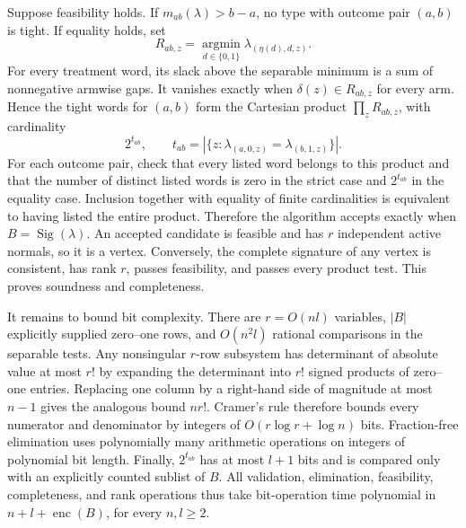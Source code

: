 Suppose feasibility holds. If \(m_{ab}(\lambda)>b-a\), no type with outcome pair \((a,b)\) is tight. If equality holds, set
\[R_{ab,z}=\operatorname*{argmin}_{d\in\{0,1\}}\lambda_{(\eta(d),d,z)}.\]
For every treatment word, its slack above the separable minimum is a sum of nonnegative armwise gaps. It vanishes exactly when \(\delta(z)\in R_{ab,z}\) for every arm. Hence the tight words for \((a,b)\) form the Cartesian product \(\prod_z R_{ab,z}\), with cardinality
\[2^{t_{ab}},\qquad t_{ab}=|\{z:\lambda_{(a,0,z)}=\lambda_{(b,1,z)}\}|.\]
For each outcome pair, check that every listed word belongs to this product and that the number of distinct listed words is zero in the strict case and \(2^{t_{ab}}\) in the equality case. Inclusion together with equality of finite cardinalities is equivalent to having listed the entire product. Therefore the algorithm accepts exactly when \(B=\operatorname{Sig}(\lambda)\). An accepted candidate is feasible and has \(r\) independent active normals, so it is a vertex. Conversely, the complete signature of any vertex is consistent, has rank \(r\), passes feasibility, and passes every product test. This proves soundness and completeness.

It remains to bound bit complexity. There are \(r=O(nl)\) variables, \(|B|\) explicitly supplied zero--one rows, and \(O(n^2l)\) rational comparisons in the separable tests. Any nonsingular \(r\)-row subsystem has determinant of absolute value at most \(r!\) by expanding the determinant into \(r!\) signed products of zero--one entries. Replacing one column by a right-hand side of magnitude at most \(n-1\) gives the analogous bound \(n r!\). Cramer's rule therefore bounds every numerator and denominator by integers of \(O(r\log r+\log n)\) bits. Fraction-free elimination uses polynomially many arithmetic operations on integers of polynomial bit length. Finally, \(2^{t_{ab}}\) has at most \(l+1\) bits and is compared only with an explicitly counted sublist of \(B\). All validation, elimination, feasibility, completeness, and rank operations thus take bit-operation time polynomial in \(n+l+\operatorname{enc}(B)\), for every \(n,l\ge2\).